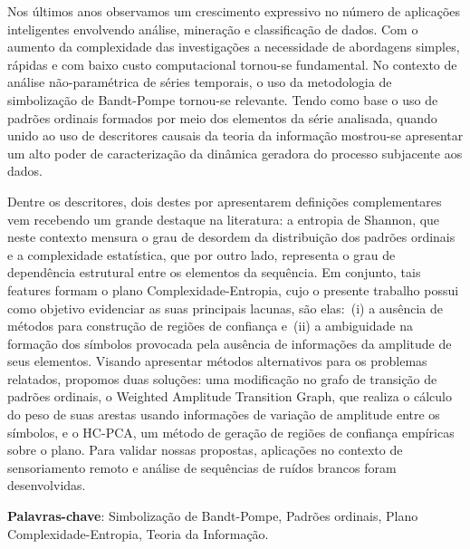 Nos últimos anos observamos um crescimento expressivo no número de aplicações inteligentes envolvendo análise, mineração e classificação de dados.
Com o aumento da complexidade das investigações a necessidade de abordagens simples, rápidas e com baixo custo computacional tornou-se fundamental.
No contexto de análise não-paramétrica de séries temporais, o uso da metodologia de simbolização de Bandt-Pompe tornou-se relevante.
Tendo como base o uso de padrões ordinais formados por meio dos elementos da série analisada, quando unido ao uso de descritores causais da teoria da informação mostrou-se apresentar um alto poder de caracterização da dinâmica geradora do processo subjacente aos dados.

Dentre os descritores, dois destes por apresentarem definições complementares vem recebendo um grande destaque na literatura: a entropia de Shannon, que neste contexto mensura o grau de desordem da distribuição dos padrões ordinais e a complexidade estatística, que por outro lado, representa o grau de dependência estrutural entre os elementos da sequência.
Em conjunto, tais features formam o plano Complexidade-Entropia, cujo o presente trabalho possui como objetivo evidenciar as suas principais lacunas, são elas:~(i) a ausência de métodos para construção de regiões de confiança e~(ii) a ambiguidade na formação dos símbolos provocada pela ausência de informações da amplitude de seus elementos.
Visando apresentar métodos alternativos para os problemas relatados, propomos duas soluções: uma modificação no grafo de transição de padrões ordinais, o Weighted Amplitude Transition Graph, que realiza o cálculo do peso de suas arestas usando informações de variação de amplitude entre os símbolos, e o HC-PCA, um método de geração de regiões de confiança empíricas sobre o plano.
Para validar nossas propostas, aplicações no contexto de sensoriamento remoto e análise de sequências de ruídos brancos foram desenvolvidas.

\textbf{Palavras-chave}: Simbolização de Bandt-Pompe, Padrões ordinais, Plano Complexidade-Entropia, Teoria da Informação.

